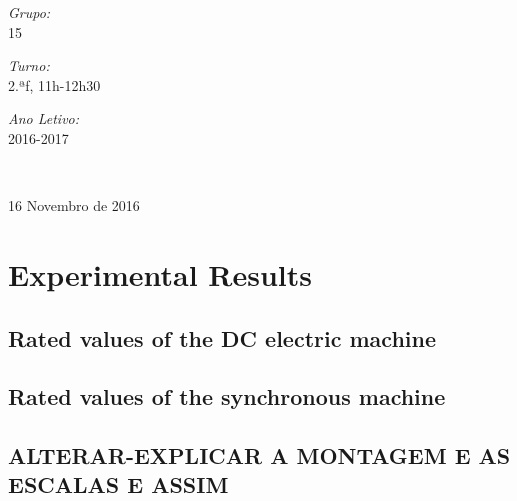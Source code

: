 \documentclass[12pt,a4paper,oneside]{article}
\begin{document}
\begin{titlepage}
\begin{center}
\noindent
\begin{minipage}{0.3\textwidth}
\begin{flushleft} \large
\emph{Grupo:} \\ 
15
\end{flushleft}
\end{minipage}
\begin{minipage}{0.3\textwidth}
\begin{center} \large
\emph{Turno:} \\ 
2.ªf, 11h-12h30
\end{center}
\end{minipage}
\begin{minipage}{0.3\textwidth}
\begin{flushright} \large
\emph{Ano Letivo:} \\
2016-2017
\end{flushright}
\end{minipage}
\\[0.5cm]
\vfill

{\large 16 Novembro de 2016}

\end{center}
\end{titlepage}


\tableofcontents
\clearpage

\section{Experimental Results}
\subsection{Rated values of the DC electric machine}
\subsection{Rated values of the synchronous machine}
\subsection{ALTERAR-EXPLICAR A MONTAGEM E AS ESCALAS E ASSIM}
\end{document}
